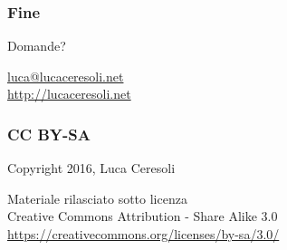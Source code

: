 \documentclass[xetex,table]{beamer}
\begin{document}
\begin{frame}
  \frametitle{Fine}

  \begin{center}
    {\Huge Domande?}

    \vspace{0.1\textheight}

    \href{mailto:luca@lucaceresoli.net}{luca@lucaceresoli.net}\\
    \url{http://lucaceresoli.net}
  \end{center}
\end{frame}

\begin{frame}
  \frametitle{CC BY-SA}
  \begin{center}
    \textcopyright{} Copyright 2016, Luca Ceresoli\\

    \vspace{0.05\textheight}

    \small
    Materiale rilasciato sotto licenza\\
    Creative Commons Attribution - Share Alike 3.0 \\
    \url{https://creativecommons.org/licenses/by-sa/3.0/} \\
  \end{center}
\end{frame}
\end{document}
